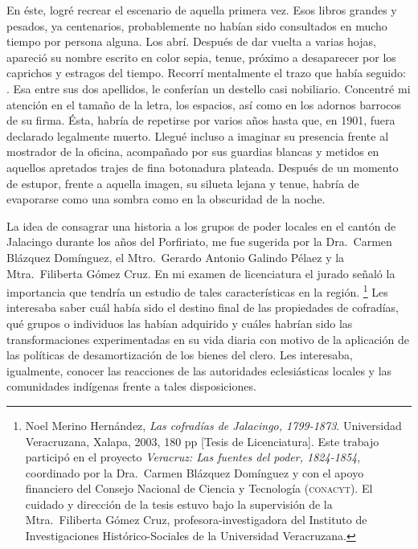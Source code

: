 \documentclass[14pt,twoside,final]{extbook} %
\let\oldfootnote\footnote
\renewcommand\footnote[1]{%
\oldfootnote{\hspace{1mm}#1}}
\begin{document}
En éste, logré recrear el escenario de aquella primera vez. Esos libros grandes y pesados, ya centenarios, probablemente no habían sido consultados en mucho tiempo por persona alguna. Los abrí. Después de dar vuelta a varias hojas, apareció su nombre escrito en color sepia, tenue, próximo a desaparecer por los caprichos y estragos del tiempo. Recorrí mentalmente el trazo que había seguido: . Esa \kern5pt entre sus dos apellidos, le conferían un destello casi nobiliario. Concentré mi atención en el tamaño de la letra, los espacios, así como en los adornos barrocos de su firma. Ésta, habría de repetirse por varios años hasta que, en 1901, fuera declarado legalmente muerto. Llegué incluso a imaginar su presencia frente al mostrador de la oficina, acompañado por sus guardias blancas y metidos en aquellos apretados trajes de fina botonadura plateada. Después de un momento de estupor, frente a aquella imagen, su silueta lejana y tenue, habría de evaporarse como una sombra como en la obscuridad de la noche.

La idea de consagrar una historia a los grupos de poder locales en el cantón de Jalacingo durante los años del Porfiriato, me fue sugerida por la Dra.~Carmen Blázquez Domínguez, el Mtro.~Gerardo Antonio Galindo Pélaez y la Mtra.~Filiberta Gómez Cruz. En mi examen de licenciatura el jurado señaló la importancia que tendría un estudio de tales características en la región.\footnote{Noel Merino Hernández, \emph{Las cofradías de Jalacingo, 1799-1873}. Universidad Veracruzana, Xalapa, 2003, 180 pp [Tesis de Licenciatura]. Este trabajo participó en el proyecto \emph{Veracruz: Las fuentes del poder, 1824-1854}, coordinado por la Dra.~Carmen Blázquez Domínguez y con el apoyo financiero del Consejo Nacional de Ciencia y Tecnología (\textsc{conacyt}). El cuidado y dirección de la tesis estuvo bajo la supervisión de la Mtra.~Filiberta Gómez Cruz, profesora-investigadora del Instituto de Investigaciones Histórico-Sociales de la Universidad Veracruzana.} Les interesaba saber cuál había sido el destino final de las propiedades de cofradías, qué grupos o individuos las habían adquirido y cuáles habrían sido las transformaciones experimentadas en su vida diaria con motivo de la aplicación de las políticas de desamortización de los bienes del clero. Les interesaba, igualmente, conocer las reacciones de las autoridades eclesiásticas locales y las comunidades indígenas frente a tales disposiciones.
\end{document}
